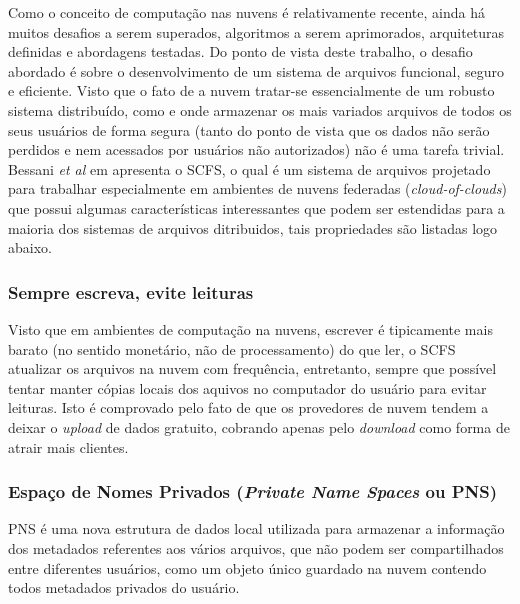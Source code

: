 Como o conceito de computação nas nuvens é relativamente recente, ainda há muitos desafios a serem superados, algoritmos a serem aprimorados, arquiteturas definidas e abordagens testadas. Do ponto de vista deste trabalho, o desafio abordado é sobre o desenvolvimento de um sistema de arquivos funcional, seguro e eficiente. Visto que o fato de a nuvem tratar-se essencialmente de um robusto sistema distribuído, como e onde armazenar os mais variados arquivos de todos os seus usuários de forma segura (tanto do ponto de vista que os dados não serão perdidos e nem acessados por usuários não autorizados) não é uma tarefa trivial. Bessani \textit{et al} em \cite{bessani1} apresenta o SCFS, o qual é um sistema de arquivos projetado para trabalhar especialmente em ambientes de nuvens federadas (\textit{cloud-of-clouds}) que possui algumas características interessantes que podem ser estendidas para a maioria dos sistemas de arquivos ditribuidos, tais propriedades são listadas logo abaixo. \\

	\subsubsection{Sempre escreva, evite leituras}
	Visto que em ambientes de computação na nuvens, escrever é tipicamente mais barato (no sentido monetário, não de processamento) do que ler, o SCFS atualizar os arquivos na nuvem com frequência, entretanto, sempre que possível tentar manter cópias locais dos aquivos no computador do usuário para evitar leituras. Isto é comprovado pelo fato de que os provedores de nuvem tendem a deixar o \textit{upload} de dados gratuito, cobrando apenas pelo \textit{download} como forma de atrair mais clientes.
	
	\subsubsection{ Espaço de Nomes Privados (\textit{Private Name Spaces} ou PNS)}
	PNS é uma nova estrutura de dados local utilizada para armazenar a informação dos metadados referentes aos vários arquivos, que não podem ser compartilhados entre diferentes usuários, como um objeto único guardado na nuvem contendo todos metadados privados do usuário.
	
